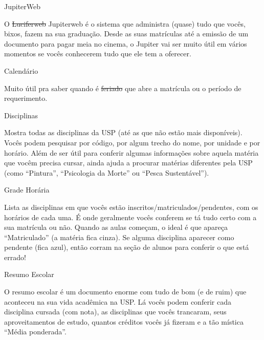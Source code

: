 \begin{secao}{JupiterWeb}

O \sout{Luciferweb} Jupiterweb é o sistema que administra (quase) tudo que
vocês, bixos, fazem na sua graduação. Desde as suas matrículas até a emissão de
um documento para pagar meia no cinema, o Jupiter vai ser muito útil em
vários momentos se vocês conhecerem tudo que ele tem a oferecer.

\begin{subsecao}{Calendário}

Muito útil pra saber quando é \sout{feriado} que abre a matrícula ou o período
de requerimento.

\end{subsecao}

\begin{subsecao}{Disciplinas}

Mostra todas as disciplinas da USP (até as que não estão mais disponíveis).
Vocês podem pesquisar por código, por algum trecho do nome, por unidade e por
horário. Além de ser útil para conferir algumas informações sobre aquela
matéria que vocêm precisa cursar, ainda ajuda a procurar matérias diferentes
pela USP (como “Pintura”, “Psicologia da Morte” ou “Pesca Sustentável”).

\end{subsecao}

\begin{subsecao}{Grade Horária}

Lista as disciplinas em que vocês estão inscritos/matriculados/pendentes, com os
horários de cada uma. É onde geralmente vocês conferem se tá tudo certo com a
sua matrícula ou não. Quando as aulas começam, o ideal é que apareça
“Matriculado” (a matéria fica cinza). Se alguma disciplina aparecer como
pendente (fica azul), então corram na seção de alunos para conferir o que está
errado!

\end{subsecao}

\begin{subsecao}{Resumo Escolar}

O resumo escolar é um documento enorme com tudo de bom (e de ruim) que
aconteceu na sua vida acadêmica na USP. Lá vocês podem conferir cada
disciplina cursada (com nota), as disciplinas que vocês trancaram, seus
aproveitamentos de estudo, quantos créditos vocês já fizeram e a tão mística
“Média ponderada”.

\end{subsecao}


\end{secao}
